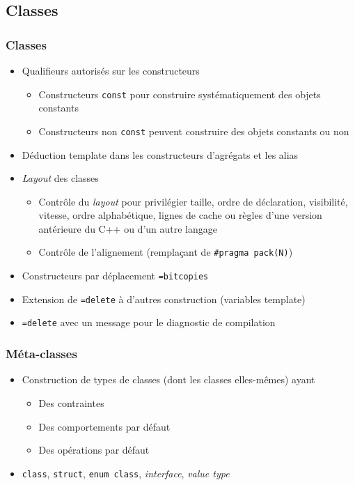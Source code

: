 \documentclass[C++.tex]{subfiles}
\begin{document}
\subsection*{Classes}
\begin{frame}[fragile]
	\frametitle{Classes}
	\begin{itemize}
		\item Qualifieurs autorisés sur les constructeurs
		\begin{itemize}
			\item Constructeurs \lstinline|const| pour construire systématiquement des objets constants
			\item Constructeurs non \lstinline|const| peuvent construire des objets constants ou non
		\end{itemize}
		\item Déduction template dans les constructeurs d'agrégats et les alias
		\item \textit{Layout} des classes
		\begin{itemize}
			\item Contrôle du \textit{layout} pour privilégier taille, ordre de déclaration, visibilité, vitesse, ordre alphabétique, lignes de cache ou règles d'une version antérieure du C++ ou d'un autre langage
			\item Contrôle de l'alignement (remplaçant de \lstinline|#pragma pack(N)|)


		\end{itemize}
		\item Constructeurs par déplacement \lstinline|=bitcopies|
		\item Extension de \lstinline|=delete| à d'autres construction (variables template)
		\item \lstinline|=delete| avec un message pour le diagnostic de compilation
	\end{itemize}
\end{frame}

\begin{frame}[fragile]
	\frametitle{Méta-classes}
	\begin{itemize}
		\item Construction de types de classes (dont les classes elles-mêmes) ayant
		\begin{itemize}
			\item Des contraintes
			\item Des comportements par défaut
			\item Des opérations par défaut
		\end{itemize}
		\item \lstinline|class|, \lstinline|struct|, \lstinline|enum class|, \textit{interface}, \textit{value type}
	\end{itemize}
\end{frame}
\end{document}

